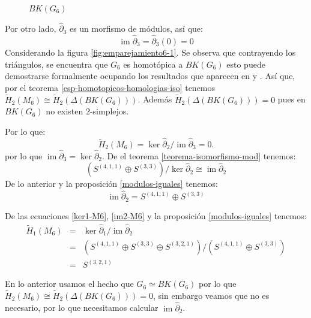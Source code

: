 \documentclass[12pt]{book}
\theoremstyle{definition}
\DeclareMathOperator{\im}{im}
\newcounter{in}
\newcounter{ini}
\begin{document}
\begin{figure}[h]
\begin{center}
\begin{minipage}{0.45\linewidth}
      \caption{$BK(G_{6})$}
      \label{grafica-contraible-M6}
    \end{minipage}
  \end{center}
\end{figure}

Por otro lado, $\widehat\partial_{3}$ es un morfismo de módulos, así que:
\begin{equation*}
\im\widehat\partial_{3}=\widehat\partial_{3}(0)=0
\label{im3-KM5}
\end{equation*}
Considerando la figura \ref{fig:emparejamiento6-1}. Se observa que contrayendo los
triángulos, se encuentra que $G_{6}$ es homotópica a $BK(G_{6})$ esto
puede demostrarse formalmente ocupando los resultados que aparecen en
\cite{LPV08a} y \cite{Pri92}. Así que, por el teorema
\ref{esp-homotopicos-homologias-iso} tenemos $\widetilde
H_{2}(M_{6})\cong\widetilde H_{2}(\Delta(BK(G_{6})))$. Además
$\widetilde H_{2}(\Delta(BK(G_{6})))=0$ pues en $BK(G_{6})$ no existen $2$-simplejos.

Por lo que:
\begin{equation*}
\widetilde H_{2}(M_{6})=\ker \widehat\partial_{2}/\im \widehat\partial_{3}=0.
\end{equation*}
por lo que $\im \widehat\partial_{3}=\ker \widehat\partial_{2}$. De el teorema
\ref{teorema-isomorfismo-mod} tenemos:
$$(S^{(4,1,1)}\oplus S^{(3,3)})/\ker \widehat\partial_{2}\cong \im \widehat\partial_{2}$$
De lo anterior y la proposición \ref{modulos-iguales} tenemos:
\begin{equation}
\im \widehat\partial_{2}=S^{(4,1,1)}\oplus S^{(3,3)}
\label{im2-M6}
\end{equation}

De las ecuaciones \ref{ker1-M6}, \ref{im2-M6} y la proposición
\ref{modulos-iguales} tenemos:
\begin{eqnarray*}
  \widetilde H_{1}(M_{6})&=&\ker \widehat\partial_{1}/\im
  \widehat\partial_{2}\\
  &=&(S^{(4,1,1)}\oplus S^{(3,3)}\oplus
  S^{(3,2,1)})/(S^{(4,1,1)}\oplus S^{(3,3)})\\
  &=&S^{(3,2,1)}
\end{eqnarray*}

En lo anterior usamos el  hecho que $G_{6}\simeq BK(G_{6})$ por lo que $\widetilde H_{2}(M_{6})\cong\widetilde H_{2}(\Delta(BK(G_{6})))=0$, sin embargo veamos que no es necesario, por lo que
necesitamos calcular $\im \widehat\partial_{2}$. 
\end{document}
